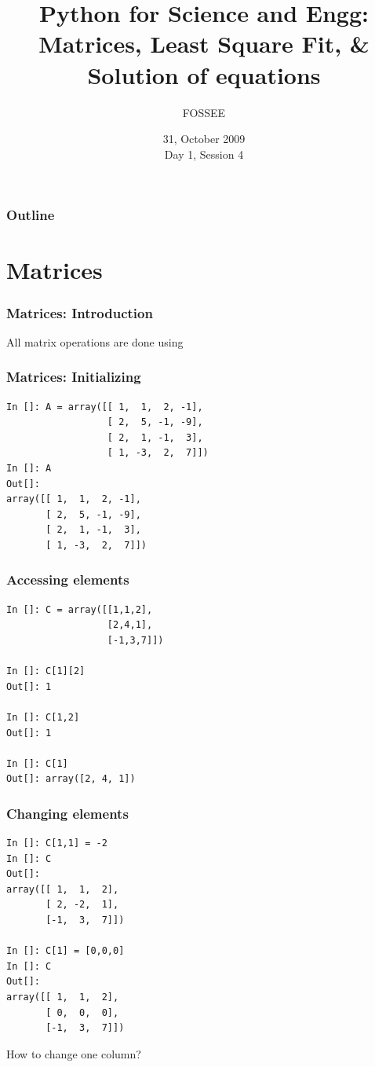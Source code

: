 \documentclass[14pt,compress]{beamer}
\title[Matrices \& Equations]{Python for Science and Engg: Matrices, Least Square Fit, \& Solution of equations}
\author[FOSSEE] {FOSSEE}
\institute[IIT Bombay] {Department of Aerospace Engineering\\IIT Bombay}
\date[] {31, October 2009\\Day 1, Session 4}
\newcommand{\kwrd}[1]{ \texttt{\textbf{\color{blue}{#1}}}  }
\begin{document}
\begin{frame}
  \titlepage
\end{frame}

\begin{frame}
  \frametitle{Outline}
  \tableofcontents
\end{frame}

\section{Matrices}

\begin{frame}
\frametitle{Matrices: Introduction}
\alert{All matrix operations are done using \kwrd{arrays}}
\end{frame}

\begin{frame}[fragile]
\frametitle{Matrices: Initializing}
\begin{lstlisting}
In []: A = array([[ 1,  1,  2, -1],
                  [ 2,  5, -1, -9],
                  [ 2,  1, -1,  3],
                  [ 1, -3,  2,  7]])
In []: A
Out[]: 
array([[ 1,  1,  2, -1],
       [ 2,  5, -1, -9],
       [ 2,  1, -1,  3],
       [ 1, -3,  2,  7]])
\end{lstlisting}
\end{frame}

\begin{frame}[fragile]
  \frametitle{Accessing elements}
  \begin{lstlisting}
In []: C = array([[1,1,2],
                  [2,4,1],
                  [-1,3,7]])

In []: C[1][2]
Out[]: 1

In []: C[1,2]
Out[]: 1

In []: C[1]
Out[]: array([2, 4, 1])
  \end{lstlisting}
\end{frame}

\begin{frame}[fragile]
  \frametitle{Changing elements}
  \begin{small}
  \begin{lstlisting}
In []: C[1,1] = -2
In []: C
Out[]: 
array([[ 1,  1,  2],
       [ 2, -2,  1],
       [-1,  3,  7]])

In []: C[1] = [0,0,0]
In []: C
Out[]: 
array([[ 1,  1,  2],
       [ 0,  0,  0],
       [-1,  3,  7]])
  \end{lstlisting}
  \end{small}
How to change one \alert{column}?
\end{frame}
\end{document}
